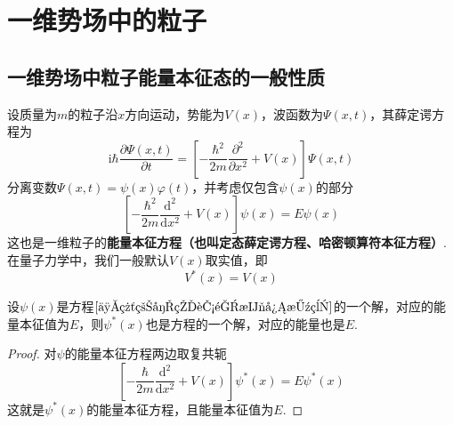 \section{一维势场中的粒子}

\subsection{一维势场中粒子能量本征态的一般性质}

设质量为$m$的粒子沿$x$方向运动，势能为$V(x)$，波函数为$\Psi(x,t)$，其薛定谔方程为
\begin{equation}\label{薛定谔方程}
    \mathrm{i}\hbar\frac{\partial \Psi(x,t)}{\partial t} = \left[-\frac{\hbar^2}{2m}\frac{\partial^2 }{\partial x^2}+V(x)\right]\Psi(x,t)
\end{equation}
分离变数$\Psi(x,t)=\psi(x)\varphi(t)$，并考虑仅包含$\psi(x)$的部分
\begin{equation}\label{一维粒子的能量本征方程}
    \left[-\frac{\hbar^2}{2m}\frac{\mathrm{d}^2}{\mathrm{d}x^2}+V(x)\right]\psi(x)=E\psi(x)
\end{equation}
这也是一维粒子的\textbf{能量本征方程（也叫定态薛定谔方程、哈密顿算符本征方程）}. 在量子力学中，我们一般默认$V(x)$取实值，即
\begin{equation}\label{量子力学中的势能是实数}
    V^*(x) = V(x)
\end{equation}



\begin{theorem}\label{定理1}
    设$\psi(x)$是方程$\eqref{一维粒子的能量本征方程}$的一个解，对应的能量本征值为$E$，则$\psi^*(x)$也是方程的一个解，对应的能量也是$E$.
\end{theorem}
\begin{proof}
    对$\psi$的能量本征方程两边取复共轭
    $$
        \left[-\frac{\hbar}{2m}\frac{\mathrm{d}^2}{\mathrm{d}x^2}+V(x)\right]\psi^*(x)=E\psi^*(x)
    $$
    这就是$\psi^*(x)$的能量本征方程，且能量本征值为$E$.
\end{proof}





